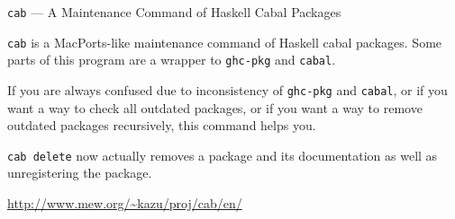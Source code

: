 \begin{hcarentry}[updated]{{\tt cab} --- A Maintenance Command of Haskell Cabal Packages}
\makeheader

{\tt cab} is a MacPorts-like maintenance command of Haskell cabal packages. Some parts of this program are a wrapper to {\tt ghc-pkg} and {\tt cabal}.

If you are always confused due to inconsistency of {\tt ghc-pkg} and {\tt cabal}, or if you want a way to check all outdated packages, or if you want a way to remove outdated packages recursively, this command helps you.

{\tt cab delete} now actually removes a package and its documentation as well as unregistering the package.

\FurtherReading
  \url{http://www.mew.org/~kazu/proj/cab/en/}
\end{hcarentry}
